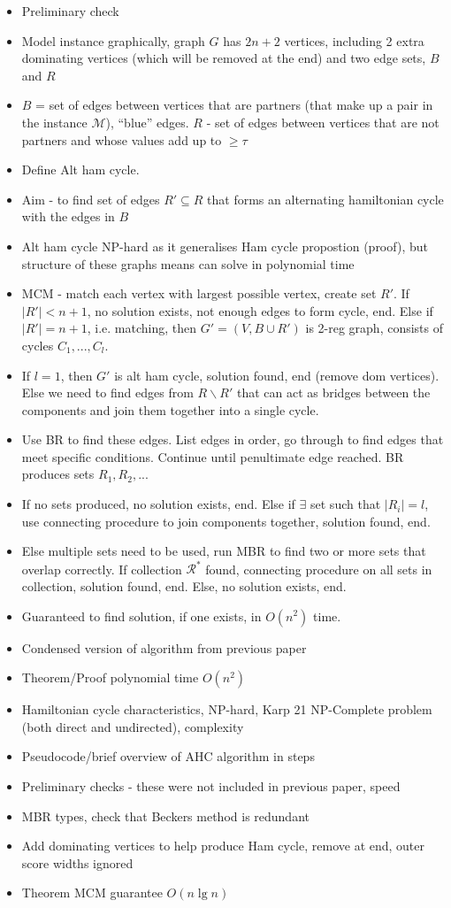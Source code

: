 \documentclass{elsarticle}
\begin{document}
\begin{itemize}
	\item Preliminary check
	\item Model instance graphically, graph $G$ has $2n+2$ vertices, including 2 extra dominating vertices (which will be removed at the end) and two edge sets, $B$ and $R$
	\item $B$ = set of edges between vertices that are partners (that make up a pair in the instance $\mathcal{M}$), ``blue'' edges. $R$ - set of edges between vertices that are not partners and whose values add up to $\geq \tau$
	\item Define Alt ham cycle.
	\item Aim - to find set of edges $R' \subseteq R$ that forms an alternating hamiltonian cycle with the edges in $B$
	\item Alt ham cycle NP-hard as it generalises Ham cycle propostion (proof), but structure of these graphs means can solve in polynomial time
	\item MCM - match each vertex with largest possible vertex, create set $R'$. If $|R'| < n+1$, no solution exists, not enough edges to form cycle, end. Else if $|R'| = n+1$, i.e. matching, then $G' = (V, B \cup R')$ is 2-reg graph, consists of cycles $C_1,...,C_l$.
	\item If $l = 1$, then $G'$ is alt ham cycle, solution found, end (remove dom vertices). Else we need to find edges from $R\backslash R'$ that can act as bridges between the components and join them together into a single cycle. 
	\item Use BR to find these edges. List edges in order, go through to find edges that meet specific conditions. Continue until penultimate edge reached. BR produces sets $R_1, R_2,...$
	\item If no sets produced, no solution exists, end. Else if $\exists$ set such that $|R_i| = l$, use connecting procedure to join components together, solution found, end.
	\item Else multiple sets need to be used, run MBR to find two or more sets that overlap correctly. If collection $\mathcal{R}^*$ found, connecting procedure on all sets in collection, solution found, end. Else, no solution exists, end.
	\item Guaranteed to find solution, if one exists, in $O(n^2)$ time.
	\item Condensed version of algorithm from previous paper
	\item Theorem/Proof polynomial time $O(n^2)$
	\item Hamiltonian cycle characteristics, NP-hard, Karp 21 NP-Complete problem (both direct and undirected), complexity
	\item Pseudocode/brief overview of AHC algorithm in steps
	\item Preliminary checks - these were not included in previous paper, speed
	\item MBR types, check that Beckers method is redundant
	\item Add dominating vertices to help produce Ham cycle, remove at end, outer score widths ignored
	\item Theorem MCM guarantee $O(n \lg n)$
\end{itemize}
\end{document}
